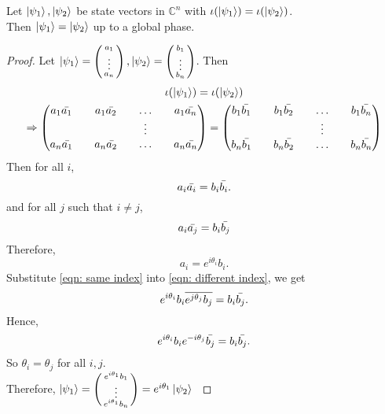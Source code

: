 \begin{lemma}
\label{lemma state into density}
Let $\ket{\psi_1}, \ket{\psi_2}$ be state vectors in ${\mathbb{C}}^n$ with $\iota({\ket{\psi_1}})=\iota(\ket{\psi_2})$.\\
Then $\ket{\psi_1}=\ket{\psi_2}$ up to a global phase.
\end{lemma}
\begin{proof}
Let $\ket{\psi_1}=\left(\begin{smallmatrix}a_1\\ \vdots \\ a_n\end{smallmatrix}\right), \ket{\psi_2}=\left(\begin{smallmatrix}b_1\\ \vdots \\ b_n\end{smallmatrix}\right)$. Then
\begin{gather}
\iota({\ket{\psi_1}})=\iota(\ket{\psi_2})\\
\Rightarrow \begin{pmatrix}
a_1 \Bar{a_1} && a_1 \Bar{a_2} && \hdots && a_1 \Bar{a_n}\\
&& && \vdots && \\
a_n \Bar{a_1} && a_n \Bar{a_2} && \hdots && a_n \Bar{a_n}\\              
\end{pmatrix}=\begin{pmatrix}
b_1 \Bar{b_1} && b_1 \Bar{b_2} && \hdots && b_1 \Bar{b_n}\\
&& && \vdots && \\
b_n \Bar{b_1} && b_n \Bar{b_2} && \hdots && b_n \Bar{b_n}\\ 
\end{pmatrix}
\end{gather}
{\color{green}
Then for all $i$, $$a_i \Bar{a_i}=b_i \Bar{b_i}.$$
and for all $j$ such that $i \ne j$, 
\begin{equation}\label{eqn: different index}
    a_i \Bar{a_j}=b_i \Bar{b_j}
\end{equation}
Therefore, 
\begin{equation}\label{eqn: same index}
   a_i=e^{i\theta_i}b_i. 
\end{equation}
Substitute \eqref{eqn: same index} into \eqref{eqn: different index}, we get 
\begin{equation}
    e^{i\theta_i}b_i \overline{e^{j\theta_j}b_j}=b_i \Bar{b_j}.
\end{equation}
Hence, $$e^{i\theta_i}b_i e^{-i\theta_j}\Bar{b_j}=b_i \Bar{b_j}.$$
So $\theta_i=\theta_j$ for all $i,j$.\\
Therefore, $\ket{\psi_1}=\left(\begin{smallmatrix}e^{i\theta_1}b_1 \\ \vdots \\ e^{i\theta_1}b_n\end{smallmatrix}\right)=e^{i\theta_1}\ket{\psi_2}$
}
\end{proof}


